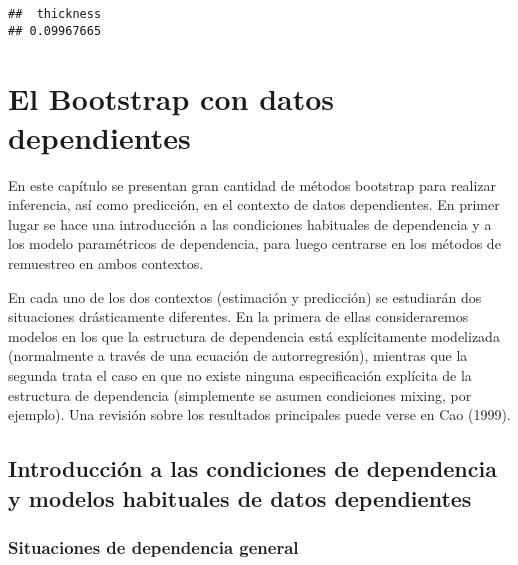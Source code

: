 \documentclass[
]{book}
\newenvironment{Shaded}{\begin{snugshade}}{\end{snugshade}}
\newcommand{\CommentTok}[1]{\textcolor[rgb]{0.56,0.35,0.01}{\textit{#1}}}
\newcommand{\NormalTok}[1]{#1}
\newcommand{\OperatorTok}[1]{\textcolor[rgb]{0.81,0.36,0.00}{\textbf{#1}}}
\theoremstyle{break}
\theoremstyle{definition}
\theoremstyle{definition}
\theoremstyle{definition}
\theoremstyle{remark}
\begin{document}
\begin{Shaded}
\end{Shaded}

\begin{verbatim}
##  thickness 
## 0.09967665
\end{verbatim}

\hypertarget{bootdep}{%
\chapter{El Bootstrap con datos dependientes}\label{bootdep}}

En este capítulo se presentan gran cantidad de métodos bootstrap para
realizar inferencia, así como predicción, en el contexto de datos
dependientes. En primer lugar se hace una introducción a las condiciones
habituales de dependencia y a los modelo paramétricos de dependencia,
para luego centrarse en los métodos de remuestreo en ambos contextos.

En cada uno de los dos contextos (estimación y predicción) se estudiarán
dos situaciones drásticamente diferentes. En la primera de ellas
consideraremos modelos en los que la estructura de dependencia está
explícitamente modelizada (normalmente a través de una ecuación de
autorregresión), mientras que la segunda trata el caso en que no existe
ninguna especificación explícita de la estructura de dependencia
(simplemente se asumen condiciones mixing, por ejemplo). Una revisión
sobre los resultados principales puede verse en Cao (1999).

\hypertarget{introducciuxf3n-a-las-condiciones-de-dependencia-y-modelos-habituales-de-datos-dependientes}{%
\section{Introducción a las condiciones de dependencia y modelos habituales de datos dependientes}\label{introducciuxf3n-a-las-condiciones-de-dependencia-y-modelos-habituales-de-datos-dependientes}}

\hypertarget{situaciones-de-dependencia-general}{%
\subsection{Situaciones de dependencia general}\label{situaciones-de-dependencia-general}}
\end{document}
